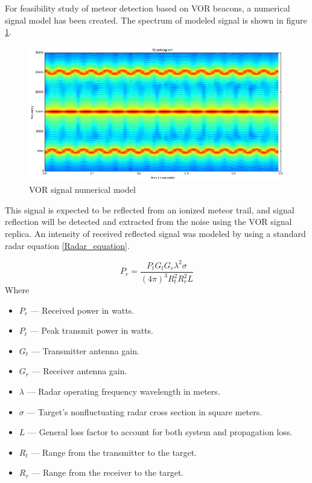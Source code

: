 \documentclass[twoside]{ctuthesis}
\theoremstyle{plain}
\theoremstyle{definition}
\theoremstyle{note}
\begin{document}
For feasibility study of meteor detection based on VOR beacons, a numerical signal model has been created. The spectrum of modeled signal is shown in figure \ref{VOR_signal}.

\begin{figure}
\includegraphics[width=\textwidth]{./img/VOR_signal.png}
\caption{VOR signal numerical model}
\label{VOR_signal}
\end{figure}

This signal is expected to be reflected from an ionized meteor trail, and signal reflection will be detected and extracted from the noise using the VOR signal replica. An intensity of received reflected signal was modeled by using a standard radar equation \ref{Radar_equation}.

\begin{equation}
P_r = \frac{P_t G_t G_r \lambda^2 \sigma}{(4 \pi)^3 R_t ^2 R_r ^2 L}
\label{Radar_equation}
\end{equation}
Where 
\begin{itemize}
\item $P_r$ — Received power in watts.
\item $P_t$ — Peak transmit power in watts.
\item $G_t$ — Transmitter antenna gain.
\item $G_r$ — Receiver antenna gain.
\item $\lambda$ — Radar operating frequency wavelength in meters.
\item $\sigma$ — Target's nonfluctuating radar cross section in square meters.
\item $L$ — General loss factor to account for both system and propagation loss.
\item $R_t$ — Range from the transmitter to the target.
\item $R_r$ — Range from the receiver to the target. 
\end{itemize}
\end{document}
